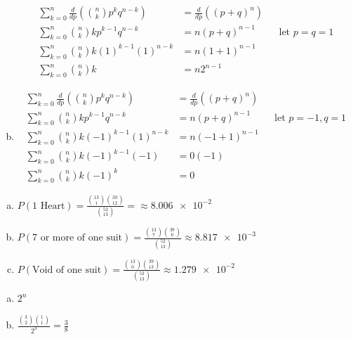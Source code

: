 \documentclass[12pt]{article}
\newenvironment{problem}[2][Problem]{\begin{trivlist}
\item[\hskip \labelsep {\bfseries #1}\hskip \labelsep {\bfseries #2.}]
  \vspace{1 cm}
}{\end{trivlist}}
\begin{document}
\begin{problem}{2.31}
\begin{enumerate}[a.]
\begin{align*}
        \sum_{k=0}^n \frac{d}{dp}\left( \binom{n}{k} p^k q^{n-k}\right) &= \frac{d}{dp}\left((p+q)^n \right) \\
        \sum_{k=0}^n \binom{n}{k}k p^{k-1} q^{n-k} &= n(p+q)^{n-1} & & \textrm{let } p=q=1 \\
        \sum_{k=0}^n \binom{n}{k}k(1)^{k-1}(1)^{n-k} &= n(1+1)^{n-1} \\
        \sum_{k=0}^n \binom{n}{k}k &= n2^{n-1}
      \end{align*}
    \item %
       \begin{align*}
        \sum_{k=0}^n \frac{d}{dp}\left( \binom{n}{k} p^k q^{n-k}\right) &= \frac{d}{dp}\left((p+q)^n \right) \\
        \sum_{k=0}^n \binom{n}{k}k p^{k-1} q^{n-k} &= n(p+q)^{n-1} & & \textrm{let } p=-1, q=1 \\
        \sum_{k=0}^n \binom{n}{k}k(-1)^{k-1}(1)^{n-k} &= n(-1+1)^{n-1} \\
        \sum_{k=0}^n \binom{n}{k}k(-1)^{k-1}(-1) &= 0(-1) \\
        \sum_{k=0}^n \binom{n}{k}k(-1)^{k} &= 0 
      \end{align*}
  \end{enumerate}
\end{problem}

\begin{problem}{2.33}
\item
  \begin{enumerate}[a.]
    \item %
      $P(\textrm{1 Heart}) =  \frac{\binom{13}{1} \binom{39}{12}}{\binom{52}{13}} = \approx \num{8.006e-2}$
    \item %
      $P(\textrm{7 or more of one suit}) 
      =  \frac{\binom{13}{7} \binom{39}{6}}{\binom{52}{13}} \approx \num{8.817e-3}$
    \item %
      $P(\textrm{Void of one suit}) 
      = \frac{\binom{13}{0} \binom{39}{13}}{\binom{52}{13}} \approx \num{1.279e-2}$
  \end{enumerate}
\end{problem}

\begin{problem}{2.35}
\item
  \begin{enumerate}[a.]
    \item %
      $2^n$
    \item %
      $\frac{\binom{3}{2} \binom{1}{1}}{2^3} = \frac{3}{8}$     
  \end{enumerate}
\end{problem}
\end{document}
